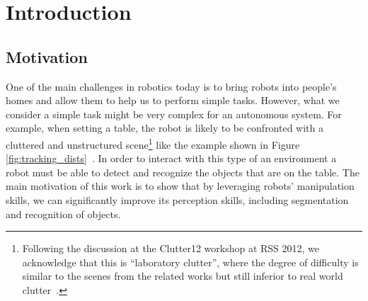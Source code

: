 \chapter{Introduction}
\label{chapter:Introduction}


 
\section{Motivation}
\label{sec:intro}
One of the main challenges in robotics today is to bring robots into people's homes and allow them to help us to perform simple tasks. However, what we consider a simple task might be very complex for an autonomous system. For example, when setting a table, the robot is likely to be
confronted with a cluttered and unstructured scene\footnote{Following the discussion at the Clutter12
workshop at RSS 2012, we acknowledge that this is ``laboratory clutter'', where the degree of difficulty
is similar to the scenes from the related works but still inferior to real world clutter~\cite{matei2010manipulation}.} like the example shown
in Figure \ref{fig:tracking_dists}~\cite{iros10kcopman}. In order to interact with this type of an environment a robot must be able to detect and recognize the objects that are on the table. The main
motivation of this work is to show that by leveraging robots' manipulation skills, we can significantly improve its perception skills, including segmentation and recognition of objects.
	
